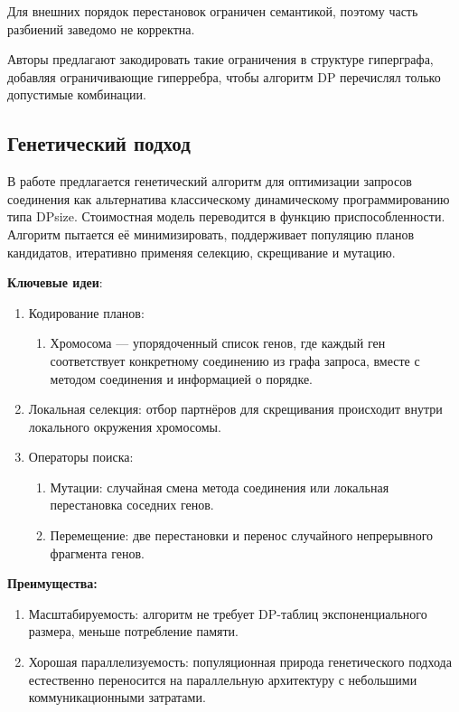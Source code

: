 Для внешних порядок перестановок ограничен семантикой, поэтому часть разбиений заведомо не корректна.
\par

Авторы предлагают закодировать такие ограничения в структуре гиперграфа, добавляя ограничивающие гиперребра, чтобы алгоритм DP перечислял только допустимые комбинации.


\subsection{Генетический подход}


В работе \cite{GEN} предлагается генетический алгоритм для оптимизации запросов соединения как альтернатива классическому
динамическому программированию типа DPsize.
Стоимостная модель переводится в функцию приспособленности. Алгоритм пытается её минимизировать, поддерживает популяцию планов кандидатов, 
итеративно применяя селекцию, скрещивание и мутацию.

\textbf{Ключевые идеи}:
\begin{enumerate}
    \item Кодирование планов:
    \begin{enumerate}
        \item Хромосома --- упорядоченный список генов, где каждый ген соответствует конкретному соединению из графа запроса,
        вместе с методом соединения и информацией о порядке.
    \end{enumerate}
    \item Локальная селекция: отбор партнёров для скрещивания происходит внутри локального окружения хромосомы.
    \item Операторы поиска:
    \begin{enumerate}
        \item Мутации: случайная смена метода соединения или локальная перестановка соседних генов.
        \item Перемещение: две перестановки и перенос случайного непрерывного фрагмента генов.
    \end{enumerate}
\end{enumerate}

\textbf{Преимущества:}
\begin{enumerate}
    \item Масштабируемость: алгоритм не требует DP-таблиц экспоненциального размера, меньше потребление памяти.
    \item Хорошая параллелизуемость: популяционная природа генетического подхода естественно переносится на параллельную архитектуру с небольшими коммуникационными затратами.
\end{enumerate}

